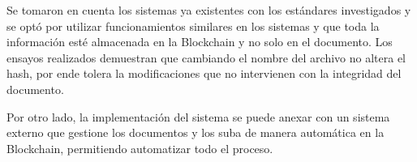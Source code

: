 Se tomaron en cuenta los sistemas ya existentes con los estándares investigados y se optó por utilizar funcionamientos similares en los sistemas y que 
toda la información esté almacenada en la  Blockchain y no solo en el documento.
Los ensayos realizados demuestran que cambiando el nombre del archivo no altera el hash, por ende tolera la modificaciones que no intervienen con 
la integridad del documento.

Por otro lado, la implementación del sistema se puede anexar con un sistema externo que gestione los documentos y los suba de manera automática en la  Blockchain, permitiendo
automatizar todo el proceso.